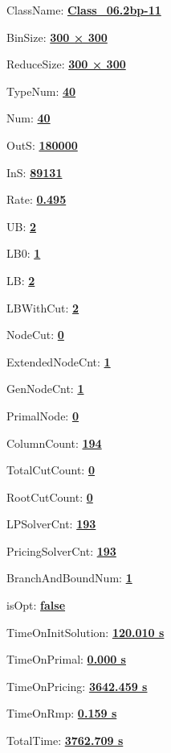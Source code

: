 \documentclass[11pt]{article}
\begin{document}
\pagestyle{empty}


ClassName: \underline{\textbf{Class_06.2bp-11}}
\par
BinSize: \underline{\textbf{300 × 300}}
\par
ReduceSize: \underline{\textbf{300 × 300}}
\par
TypeNum: \underline{\textbf{40}}
\par
Num: \underline{\textbf{40}}
\par
OutS: \underline{\textbf{180000}}
\par
InS: \underline{\textbf{89131}}
\par
Rate: \underline{\textbf{0.495}}
\par
UB: \underline{\textbf{2}}
\par
LB0: \underline{\textbf{1}}
\par
LB: \underline{\textbf{2}}
\par
LBWithCut: \underline{\textbf{2}}
\par
NodeCut: \underline{\textbf{0}}
\par
ExtendedNodeCnt: \underline{\textbf{1}}
\par
GenNodeCnt: \underline{\textbf{1}}
\par
PrimalNode: \underline{\textbf{0}}
\par
ColumnCount: \underline{\textbf{194}}
\par
TotalCutCount: \underline{\textbf{0}}
\par
RootCutCount: \underline{\textbf{0}}
\par
LPSolverCnt: \underline{\textbf{193}}
\par
PricingSolverCnt: \underline{\textbf{193}}
\par
BranchAndBoundNum: \underline{\textbf{1}}
\par
isOpt: \underline{\textbf{false}}
\par
TimeOnInitSolution: \underline{\textbf{120.010 s}}
\par
TimeOnPrimal: \underline{\textbf{0.000 s}}
\par
TimeOnPricing: \underline{\textbf{3642.459 s}}
\par
TimeOnRmp: \underline{\textbf{0.159 s}}
\par
TotalTime: \underline{\textbf{3762.709 s}}
\par
\newpage
\end{document}
